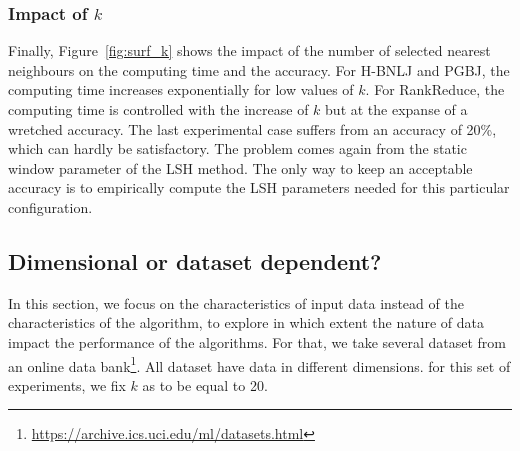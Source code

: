 \subsubsection{Impact of $k$}    
Finally, Figure~\ref{fig:surf_k} shows the impact of the number of selected nearest neighbours on the computing time and 
the accuracy. For H-BNLJ and PGBJ, the computing time increases exponentially for low values of $k$.  For RankReduce, the computing time is controlled with the increase of $k$ but at the expanse of a wretched 
accuracy. The last experimental case suffers from an accuracy of 20\%, which can hardly be satisfactory. The problem comes 
again from the static window parameter of the LSH method. The only way to keep an acceptable accuracy is to empirically 
compute the LSH parameters needed for this particular configuration.


\subsection{Dimensional or dataset dependent?}
In this section, we focus on the characteristics of input data instead of the characteristics of the algorithm, to explore in which extent the nature of data impact the performance of the algorithms. For that, we take several dataset from an online data bank\footnote{\url{https://archive.ics.uci.edu/ml/datasets.html}}. All dataset have data in different dimensions. for this set of experiments, we fix $k$ as to be equal to 20.

